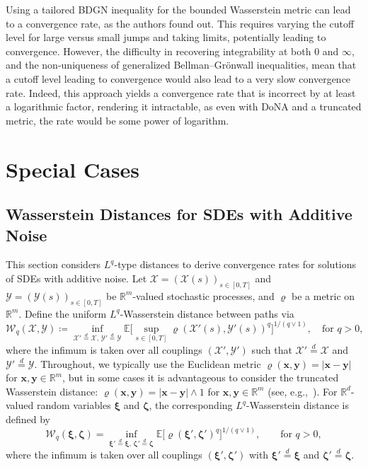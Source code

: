 \documentclass[en,oneside,bbfont,article]{amsart}
\theoremstyle{remark}
\theoremstyle{definition}
\theoremstyle{definition}
\newcommand\X{\bm{\mathcal{X}}}
\newcommand\Y{\bm{\mathcal{Y}}}
\newcommand{\mW}{\mathcal{W}}
\newcommand\R{\mathbb{R}}
\newcommand\E{\mathds{E}}
\newcommand\1{\mathds{1}}
\newcommand\eqd{\overset{d}{=}}
\begin{document}
Using a tailored BDGN inequality for the bounded Wasserstein metric can lead to a convergence rate, as the authors found out. This requires varying the cutoff level for large versus small jumps and taking limits, potentially leading to convergence. However, the difficulty in recovering integrability at both $0$ and $\infty$, and the non-uniqueness of generalized Bellman--Gr\"onwall inequalities, mean that a cutoff level leading to convergence would also lead to a very slow convergence rate. Indeed, this approach yields a convergence rate that is incorrect by at least a logarithmic factor, rendering it intractable, as even with DoNA and a truncated metric, the rate would be some power of logarithm.

\section{Special Cases}
\label{sec:special}

\subsection{Wasserstein Distances for SDEs with Additive Noise}
\label{subsec:additive}
This section considers $L^q$-type distances to derive convergence rates for solutions of SDEs with additive noise. Let $\X = (\X(s))_{s \in [0,T]}$ and $\Y = (\Y(s))_{s \in [0,T]}$ be $\R^m$-valued stochastic processes, and $\varrho$ be a metric on $\R^m$. Define the uniform $L^q$-Wasserstein distance between paths via
\begin{equation}\label{eq:general_wasserstein_trunk}
\mW_q(\X, \Y)
\coloneqq \inf_{\X' \eqd \X, \, \Y' \eqd \Y}
\E\bigg[\sup_{s \in [0,T]} \varrho(\X'(s), \Y'(s))^q\bigg]^{1/(q \vee 1)},
\quad \text{for }q > 0,
\end{equation}
where the infimum is taken over all couplings $(\X', \Y')$ such that $\X' \eqd \X$ and $\Y' \eqd \Y$. Throughout, we typically use the Euclidean metric $\varrho(\bm{x}, \bm{y}) = |\bm{x} - \bm{y}|$ for $\bm{x},\bm{y} \in \R^m$, but in some cases it is advantageous to consider the truncated Wasserstein distance: $\varrho(\bm{x}, \bm{y}) = |\bm{x} - \bm{y}| \wedge 1$ for $\bm{x},\bm{y} \in \R^m$ (see, e.g.,~\cite{MR3332269}). For $\R^d$-valued random variables $\bm{\xi}$ and $\bm{\zeta}$, the corresponding $L^q$-Wasserstein distance is defined by 
\[
\mW_{q}(\bm{\xi},\bm{\zeta}) 
= \inf_{\bm{\xi}' \eqd \bm{\xi},\,\bm{\zeta}' 
\eqd \bm{\zeta}} \E\big[\varrho(\bm{\xi}', \bm{\zeta}')^q\big]^{1/(q \vee 1)},
\qquad\text{for }q>0,
\]
where the infimum is taken over all couplings $(\bm{\xi}',\bm{\zeta}')$ with $\bm{\xi}'\eqd\bm{\xi}$ and $\bm{\zeta}'\eqd\bm{\zeta}$.
\end{document}
